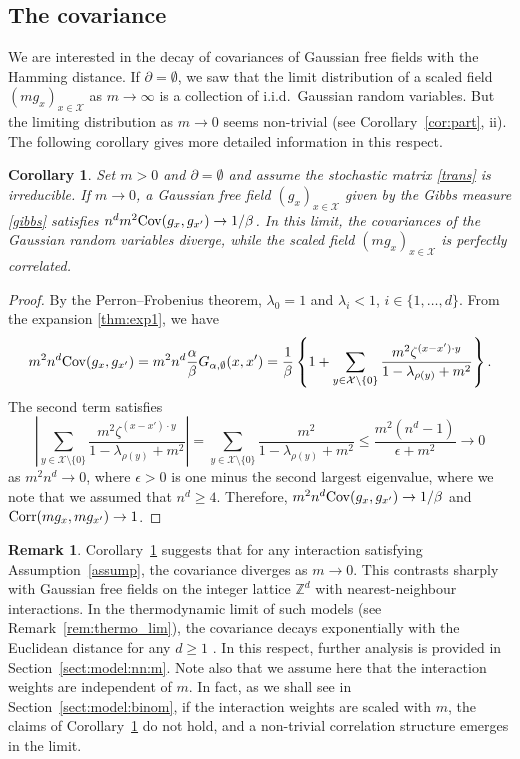 \documentclass[a4paper,11pt]{article}
\theoremstyle{plain}
\newtheorem{corollary}[theorem]{Corollary}
\theoremstyle{definition}
\newtheorem{remark}[theorem]{Remark}
\begin{document}
\subsection{The covariance}

We are interested in the decay of covariances of
Gaussian free fields with the Hamming distance.
If $\partial=\emptyset$, we saw that the limit
distribution of a scaled field $(mg_x)_{x\in\mathcal{X}}$
as $m\to\infty$ is a collection of i.i.d.\ 
Gaussian random variables. But the limiting distribution
as $m\to 0$ seems non-trivial
(see Corollary~\ref{cor:part}, ii). 
The following corollary gives more detailed information
in this respect.

\begin{corollary}\label{cor:cov}
  Set $m>0$ and $\partial=\emptyset$ and assume
  the stochastic matrix \eqref{trans} is
  irreducible. If $m\to 0$, a Gaussian free field
  $(g_x)_{x\in\mathcal{X}}$ given by the Gibbs
  measure \eqref{gibbs} satisfies
  $n^dm^2 {\rm Cov}(g_x,g_{x'})\to 1/\beta$.
  In this limit, the covariances of the Gaussian
  random variables diverge, while the scaled field
  $(mg_x)_{x\in\mathcal{X}}$ is perfectly correlated.
\end{corollary}

\begin{proof}
  By the Perron--Frobenius theorem, $\lambda_0=1$
  and $\lambda_i<1$, $i\in\{1,\ldots,d\}$. From
  the expansion \eqref{thm:exp1}, we have
  \[
  m^2n^d{\rm Cov}(g_x,g_{x'})=
  m^2n^d\frac{\alpha}{\beta}G_{\alpha,\emptyset}(x,x')=
  \frac{1}{\beta}\left\{1
    +\sum_{y\in \mathcal{X}\setminus\{0\}}
    \frac{m^2\zeta^{(x-x')\cdot y}}
    {1-\lambda_{\rho(y)}+m^2}\right\}.
  \]
  The second term satisfies
  \[
    \left|\sum_{y\in\mathcal{X}\setminus\{0\}}
    \frac{m^2\zeta^{(x-x')\cdot y}}{1-\lambda_{\rho(y)}+m^2}\right|
    =\sum_{y\in\mathcal{X}\setminus\{0\}}
    \frac{m^2}{1-\lambda_{\rho(y)}+m^2}
    \le \frac{m^2(n^d-1)}{\epsilon+m^2}\to 0
  \]
  as $m^2n^d\to 0$, where $\epsilon>0$ is one minus
  the second largest eigenvalue, where we note that
  we assumed that $n^d\ge 4$. Therefore,
  $m^2n^d{\rm Cov}(g_x,g_{x'})\to 1/\beta$ and
  ${\rm Corr}(mg_x,mg_{x'})\to 1$.
\end{proof}

\begin{remark}\label{rem:deloc}
  Corollary~\ref{cor:cov} suggests that for any
  interaction satisfying Assumption~\ref{assump},
  the covariance diverges as $m\to 0$.
  This contrasts sharply with Gaussian free fields
  on the integer lattice $\mathbb{Z}^d$ with
  nearest-neighbour interactions.
  In the thermodynamic limit of such models
  (see Remark~\ref{rem:thermo_lim}),
  the covariance decays exponentially with
  the Euclidean distance for any $d\ge 1$
  \cite[Section 8.5]{FV17}. In this respect,
  further analysis is provided in
  Section~\ref{sect:model:nn:m}.
  Note also that we assume here that the interaction
  weights are independent of $m$. In fact, as we shall
  see in Section~\ref{sect:model:binom}, if
  the interaction weights are scaled with $m$,
  the claims of Corollary~\ref{cor:cov} do not hold, and
  a non-trivial correlation structure emerges in
  the limit.
\end{remark}
\end{document}
